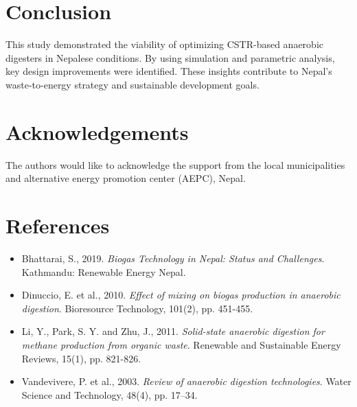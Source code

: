 \documentclass[12pt,a4paper]{article}
\begin{document}
\section{Conclusion}
This study demonstrated the viability of optimizing CSTR-based anaerobic digesters in Nepalese conditions. By using simulation and parametric analysis, key design improvements were identified. These insights contribute to Nepal’s waste-to-energy strategy and sustainable development goals.

\section*{Acknowledgements}
The authors would like to acknowledge the support from the local municipalities and alternative energy promotion center (AEPC), Nepal.

\section*{References}
\begin{itemize}
  \item Bhattarai, S., 2019. \textit{Biogas Technology in Nepal: Status and Challenges}. Kathmandu: Renewable Energy Nepal.
  \item Dinuccio, E. et al., 2010. \textit{Effect of mixing on biogas production in anaerobic digestion}. Bioresource Technology, 101(2), pp. 451-455.
  \item Li, Y., Park, S. Y. and Zhu, J., 2011. \textit{Solid-state anaerobic digestion for methane production from organic waste}. Renewable and Sustainable Energy Reviews, 15(1), pp. 821-826.
  \item Vandevivere, P. et al., 2003. \textit{Review of anaerobic digestion technologies}. Water Science and Technology, 48(4), pp. 17–34.
\end{itemize}
\end{document}
